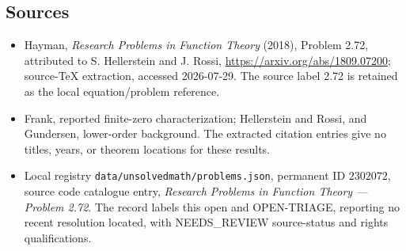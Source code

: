 \documentclass[11pt]{article}
\begin{document}
\subsection{Sources}
\begin{itemize}
\item Hayman, \emph{Research Problems in Function Theory} (2018), Problem 2.72, attributed to S. Hellerstein and J. Rossi, \url{https://arxiv.org/abs/1809.07200}; source-TeX extraction, accessed 2026-07-29. The source label 2.72 is retained as the local equation/problem reference.
\item Frank, reported finite-zero characterization; Hellerstein and Rossi, and Gundersen, lower-order background. The extracted citation entries give no titles, years, or theorem locations for these results.
\item Local registry \texttt{data/unsolvedmath/problems.json}, permanent ID $2302072$, source code catalogue entry, \emph{Research Problems in Function Theory --- Problem 2.72}. The record labels this open and OPEN-TRIAGE, reporting no recent resolution located, with NEEDS\_REVIEW source-status and rights qualifications.
\end{itemize}
\end{document}
